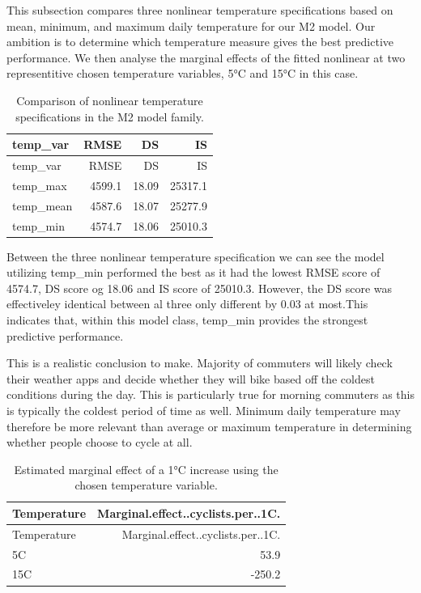\documentclass[
]{article}
\begin{document}
This subsection compares three nonlinear temperature specifications
based on mean, minimum, and maximum daily temperature for our M2 model.
Our ambition is to determine which temperature measure gives the best
predictive performance. We then analyse the marginal effects of the
fitted nonlinear at two representitive chosen temperature variables, 5°C
and 15°C in this case.

\begin{longtable}[]{@{}lrrr@{}}
\caption{Comparison of nonlinear temperature specifications in the M2
model family.}\tabularnewline
\toprule\noalign{}
temp\_var & RMSE & DS & IS \\
\midrule\noalign{}
\endfirsthead
\toprule\noalign{}
temp\_var & RMSE & DS & IS \\
\midrule\noalign{}
\endhead
\bottomrule\noalign{}
\endlastfoot
temp\_max & 4599.1 & 18.09 & 25317.1 \\
temp\_mean & 4587.6 & 18.07 & 25277.9 \\
temp\_min & 4574.7 & 18.06 & 25010.3 \\
\end{longtable}

Between the three nonlinear temperature specification we can see the
model utilizing temp\_min performed the best as it had the lowest RMSE
score of 4574.7, DS score og 18.06 and IS score of 25010.3. However, the
DS score was effectiveley identical between al three only different by
0.03 at most.This indicates that, within this model class, temp\_min
provides the strongest predictive performance.

This is a realistic conclusion to make. Majority of commuters will
likely check their weather apps and decide whether they will bike based
off the coldest conditions during the day. This is particularly true for
morning commuters as this is typically the coldest period of time as
well. Minimum daily temperature may therefore be more relevant than
average or maximum temperature in determining whether people choose to
cycle at all.

\begin{longtable}[]{@{}lr@{}}
\caption{Estimated marginal effect of a 1°C increase using the chosen
temperature variable.}\tabularnewline
\toprule\noalign{}
Temperature & Marginal.effect..cyclists.per..1C. \\
\midrule\noalign{}
\endfirsthead
\toprule\noalign{}
Temperature & Marginal.effect..cyclists.per..1C. \\
\midrule\noalign{}
\endhead
\bottomrule\noalign{}
\endlastfoot
5C & 53.9 \\
15C & -250.2 \\
\end{longtable}
\end{document}
